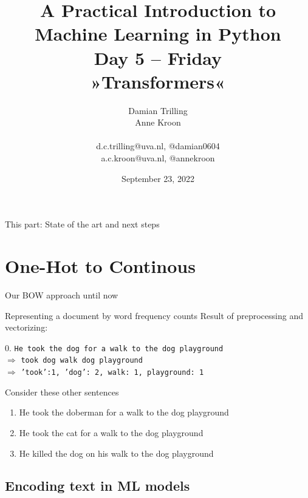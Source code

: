 \documentclass[compress]{beamer}
\title[ML in PYthon]{\textbf{A Practical Introduction to Machine Learning in Python} \\Day 5 -- Friday \\ »Transformers«}
\author[Damian Trilling, Anne Kroon]{Damian Trilling \\ Anne Kroon \\ ~ \\ \footnotesize{d.c.trilling@uva.nl, @damian0604 \\a.c.kroon@uva.nl, @annekroon} \\}
\date{September 23, 2022}
\institute[Gesis]{Gesis}
\begin{document}
\begin{frame}{}
	\titlepage
\end{frame}

\begin{frame}{This part: State of the art and next steps}
	\tableofcontents
\end{frame}


\section{One-Hot to Continous}

\begin{frame}{Our BOW approach until now}
	\begin{block}{Representing a document by word frequency counts}
		Result of preprocessing and vectorizing:
		
		0. \texttt{He took the dog for a walk to the dog playground}\\
		$\Rightarrow$ \texttt{took dog walk dog playground}\\
		$\Rightarrow$ \texttt{'took':1, 'dog': 2, walk: 1, playground: 1}
	\end{block}
	
	Consider these other sentences
	\begin{enumerate}
		\item<2-> He took the doberman for a walk to the dog playground
		\item<3-> He took the cat for a walk to the dog playground
		\item<4-> He killed the dog on his walk to the dog playground 
	\end{enumerate}
	
\end{frame}

\subsection{Encoding text in ML models}
\end{document}
